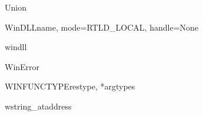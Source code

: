 \begin{classdesc}{Union}{}
\end{classdesc}

\begin{classdesc}{WinDLL}{name, mode=RTLD_LOCAL, handle=None}
\end{classdesc}

\begin{datadesc}{windll}
\end{datadesc}

\begin{funcdesc}{WinError}{}
\end{funcdesc}

\begin{funcdesc}{WINFUNCTYPE}{restype, *argtypes}
\end{funcdesc}

\begin{funcdesc}{wstring_at}{address}
\end{funcdesc}

